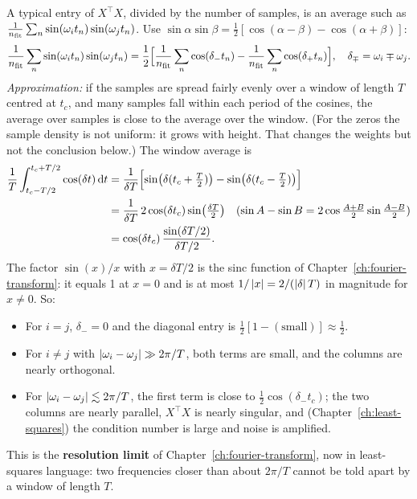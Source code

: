 A typical entry of $X^\top X$, divided by the number of samples, is an average such as $\frac{1}{n_{\rm fit}}\sum_n\sin(\omega_i t_n)\sin(\omega_j t_n)$. Use $\sin\alpha\sin\beta=\tfrac12[\cos(\alpha-\beta)-\cos(\alpha+\beta)]$:
\begin{equation}
\frac{1}{n_{\rm fit}}\sum_n\sin(\omega_i t_n)\sin(\omega_j t_n)=\frac12\Bigl[\frac{1}{n_{\rm fit}}\sum_n\cos(\delta_-t_n)-\frac{1}{n_{\rm fit}}\sum_n\cos(\delta_+t_n)\Bigr],
\quad \delta_\mp=\omega_i\mp\omega_j .
\end{equation}
\emph{Approximation:} if the samples are spread fairly evenly over a window of length $T$ centred at $t_c$, and many samples fall within each period of the cosines, the average over samples is close to the average over the window. (For the zeros the sample density is not uniform: it grows with height. That changes the weights but not the conclusion below.) The window average is
\begin{align}
\frac1T\int_{t_c-T/2}^{t_c+T/2}\cos(\delta t)\,\mathrm{d} t
&=\frac{1}{\delta T}\Bigl[\sin\bigl(\delta(t_c+\tfrac T2)\bigr)-\sin\bigl(\delta(t_c-\tfrac T2)\bigr)\Bigr]\notag\\
&=\frac{1}{\delta T}\,2\cos(\delta t_c)\sin\bigl(\tfrac{\delta T}{2}\bigr)\quad\text{($\sin A-\sin B=2\cos\tfrac{A+B}{2}\sin\tfrac{A-B}2$)}\notag\\
&=\cos(\delta t_c)\,\frac{\sin(\delta T/2)}{\delta T/2}.
\label{eq:sparse-frequency-orth}
\end{align}
The factor $\sin(x)/x$ with $x=\delta T/2$ is the sinc function of Chapter~\ref{ch:fourier-transform}: it equals 1 at $x=0$ and is at most $1/\left\lvert x\right\rvert=2/(\left\lvert \delta\right\rvert T)$ in magnitude for $x\ne0$. So:
\begin{itemize}
\item For $i=j$, $\delta_-=0$ and the diagonal entry is $\tfrac12[1-(\text{small})]\approx\tfrac12$.
\item For $i\ne j$ with $\left\lvert \omega_i-\omega_j\right\rvert\gg2\pi/T$, both terms are small, and the columns are nearly orthogonal.
\item For $\left\lvert \omega_i-\omega_j\right\rvert\lesssim2\pi/T$, the first term is close to $\tfrac12\cos(\delta_- t_c)$; the two columns are nearly parallel, $X^\top X$ is nearly singular, and (Chapter~\ref{ch:least-squares}) the condition number is large and noise is amplified.
\end{itemize}
This is the \textbf{resolution limit} of Chapter~\ref{ch:fourier-transform}, now in least-squares language: two frequencies closer than about $2\pi/T$ cannot be told apart by a window of length $T$.

